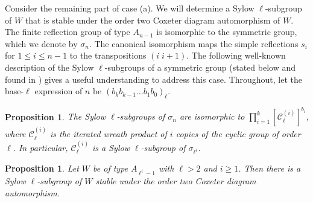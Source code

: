 \documentclass[12pt]{amsart}
\theoremstyle{plain}
\newtheorem{proposition}[theorem]{Proposition}
\theoremstyle{definition}
\numberwithin{equation}{section}
\numberwithin{equation}{section}
\begin{document}
	Consider the remaining part of case (a). We will determine a Sylow $\ell$-subgroup of $W$ that is stable under the order two Coxeter diagram automorphism of $W$. The finite reflection group of type $A_{n-1}$ is isomorphic to the symmetric group, which we denote by $\sigma_n$. The canonical isomorphism maps the simple reflections $s_i$ for $1\leq i\leq n-1$ to the transpositions $(i \; i+1)$. The following well-known description of the Sylow $\ell$-subgroups of a symmetric group (stated below and found in \cite[Pg. 82]{HALL}) gives a useful understanding to address this case. Throughout, let the base-$\ell$ expression of $n$ be $(b_kb_{k-1}\dots b_1b_0)_\ell$.
	
	\begin{proposition}\label{prop:sylowofsymmetric}
		The Sylow $\ell$-subgroups of $\sigma_n$ are isomorphic to $\prod_{i=1}^{k} [\mathcal{C}_{\ell}^{(i)}]^{b_i}$,
		where $\mathcal{C}_{\ell}^{(i)}$ is the iterated wreath product of $i$ copies of the cyclic group of order $\ell$. In particular, $\mathcal{C}_{\ell}^{(i)}$ is a Sylow $\ell$-subgroup of $\sigma_{\ell^i}$.
	\end{proposition}
	
	\begin{proposition}\label{prop:sylowinsymmetricisnormalized}
		Let $W$ be of type $A_{\ell^i-1}$ with $\ell>2$ and $i\geq1$. Then there is a Sylow $\ell$-subgroup of $W$ stable under the order two Coxeter diagram automorphism.
	\end{proposition}
	
\end{document}
